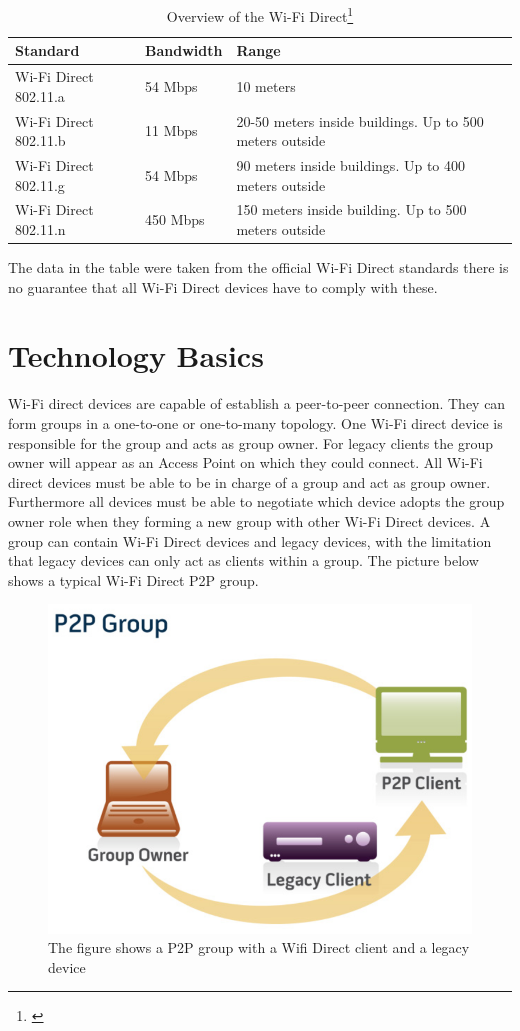\begin{center}
	\begin{table}[h]
    	\begin{tabular}{| l | l | p{6cm} |}
    	\hline
    	Standard & Bandwidth & Range\\ \hline
		Wi-Fi Direct 802.11.a & 54 Mbps & 10 meters \\ \hline
		Wi-Fi Direct 802.11.b & 11 Mbps & 20-50 meters inside buildings. \newline
		Up to 500 meters outside\\ \hline
		Wi-Fi Direct 802.11.g & 54 Mbps & 90 meters inside buildings. \newline
		Up to 400 meters outside\\ \hline
		Wi-Fi Direct 802.11.n & 450 Mbps & 150 meters inside building.\newline
		Up to 500 meters outside\\ \hline
    	\end{tabular}
    \caption{Overview of the Wi-Fi Direct\protect\footnote{\label{foot:2}}}
    \label{table:Wi-Fi Direct}
    \end{table}
\end{center}
\noindent The data in the table were taken from the official Wi-Fi Direct standards there is no guarantee that all Wi-Fi Direct devices have to comply with these\cite{wifialliance}.
\section{Technology Basics}
\label{sec:TechnologyBascs}
Wi-Fi direct devices are capable of establish a peer-to-peer connection. They can form groups in a one-to-one or one-to-many topology. One Wi-Fi direct device is responsible for the group and acts as group owner. For legacy clients the group owner will appear as an Access Point on which they could connect.
All Wi-Fi direct devices must be able to be in charge of a group and act as group owner. Furthermore all devices must be able to negotiate which device adopts the group owner role when they forming a new group with other Wi-Fi Direct devices. A group can contain Wi-Fi Direct devices and legacy devices, with the limitation that legacy devices can only act as clients within a group. The picture below shows a typical Wi-Fi Direct P2P group\cite{wifialliance}.

\begin{figure}[!hb]
	\centering
  \includegraphics[width=0.8\linewidth]{images/wifidirect.eps}
	\caption{The figure shows a P2P group with a Wifi Direct client and a legacy device\cite{wifialliance}}
	\label{fig1}
\end{figure}